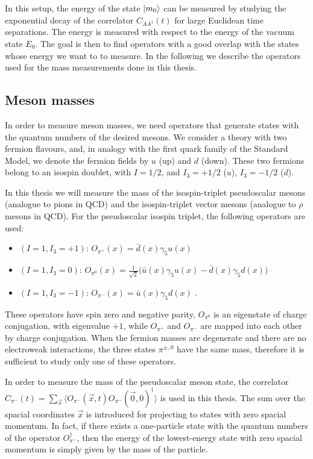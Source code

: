 In this setup, the energy of the state $\ket{m_0}$ can be measured by studying the exponential decay of the correlator $C_{AA^{\dagger}}(t)$ for large Euclidean time separations. The energy is measured with respect to the energy of the vacuum state $E_0$. The goal is then to find operators with a good overlap with the states whose energy we want to to measure. In the following we describe the operators used for the mass measurements done in this thesis.
 

\subsection{Meson masses}

In order to measure meson masses, we need operators that generate states with the quantum numbers of the desired mesons. We consider a theory with two fermion flavours, and, in analogy with the first quark family of the Standard Model, we denote the fermion fields by $u$ (up) and $d$ (down). These two fermions belong to an isospin doublet, with $I = 1/2$, and $I_3 = +1/2$ ($u$), $I_3 = -1/2$ ($d$).

In this thesis we will measure the mass of the isospin-triplet pseudoscalar mesons (analogue to pions in QCD) and the isospin-triplet vector mesons (analogue to $\rho$ mesons in QCD). For the pseudoscalar isospin triplet, the following operators are used:

\begin{itemize}
\item $(I=1, I_3 = +1)$: $O_{\pi^+}(x) = \bar{d}(x) \gamma_5 u(x)$
\item $(I=1, I_3 = 0)$: $O_{\pi^0}(x) = \frac{1}{\sqrt 2} \bigl( \bar{u}(x) \gamma_5 u(x) - \bar{d}(x) \gamma_5 d(x) \bigr)$
\item $(I=1, I_3 = -1)$: $O_{\pi^-}(x) = \bar{u}(x) \gamma_5 d(x)$ \: .
\end{itemize}
%
These operators have spin zero and negative parity, $O_{\pi^0}$ is an eigenstate of charge conjugation, with eigenvalue $+1$, while $O_{\pi^+}$ and $O_{\pi^-}$ are mapped into each other by charge conjugation. When the fermion masses are degenerate and there are no electroweak interactions, the three states $\pi^{\pm,0}$ have the same mass, therefore it is sufficient to study only one of these operators.

In order to measure the mass of the pseudoscalar meson state, the correlator $C_{\pi^-}(t) = \sum_{\vec x} \langle O_{\pi^-}(\vec x,t)  O_{\pi^-} (\vec 0,0)^{\dagger} \rangle$ is used in this thesis. The sum over the spacial coordinates $\vec x$ is introduced for projecting to states with zero spacial momentum. In fact, if there exists a one-particle state with the quantum numbers of the operator $O^{\dagger}_{\pi^-}$, then the energy of the lowest-energy state with zero spacial momentum is simply given by the mass of the particle.

